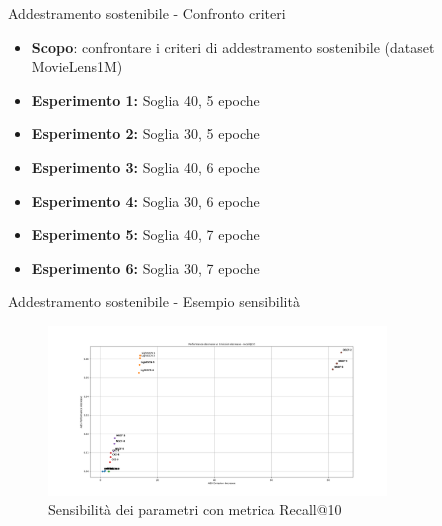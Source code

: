 \begin{frame}{Addestramento sostenibile - Confronto criteri}
    \begin{itemize}
        \item \textbf{Scopo}: confrontare i criteri di addestramento sostenibile (dataset MovieLens1M)
        \item \textbf{Esperimento 1:} Soglia 40, 5 epoche
        \item \textbf{Esperimento 2:} Soglia 30, 5 epoche
        \item \textbf{Esperimento 3:} Soglia 40, 6 epoche
        \item \textbf{Esperimento 4:} Soglia 30, 6 epoche
        \item \textbf{Esperimento 5:} Soglia 40, 7 epoche
        \item \textbf{Esperimento 6:} Soglia 30, 7 epoche
\end{itemize}
\end{frame}

\begin{frame}{Addestramento sostenibile - Esempio sensibilità}
    \begin{figure}[H]
        \centering
        \includegraphics[width=0.8\textwidth]{images/sensibility_recall@10.png}
        \caption{Sensibilità dei parametri con metrica Recall@10}
    \end{figure}
\end{frame}


